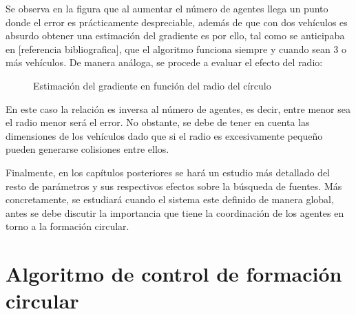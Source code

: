 Se observa en la figura que al aumentar el número de agentes llega un punto donde el error es prácticamente despreciable, además de que con dos vehículos es absurdo obtener una estimación del gradiente es por ello, tal como se anticipaba en [referencia bibliografica], que el algoritmo funciona siempre y cuando sean 3 o más vehículos. De manera análoga, se procede a evaluar el efecto del radio:

\begin{figure}[htb]
  \begin{center}
    \caption{Estimación del gradiente en función del radio del círculo}
    \label{VARD}
  \end{center}
\end{figure}

En este caso la relación es inversa al número de agentes, es decir, entre menor sea el radio menor será el error. No obstante, se debe de tener en cuenta las dimensiones de los vehículos dado que si el radio es excesivamente pequeño pueden generarse colisiones entre ellos.

Finalmente, en los capítulos posteriores se hará un estudio más detallado del resto de parámetros y sus respectivos efectos sobre la búsqueda de fuentes. Más concretamente, se estudiará cuando el sistema este definido de manera global, antes se debe discutir la importancia que tiene la coordinación de los agentes en torno a la formación circular.

\section{Algoritmo de control de formación circular}

